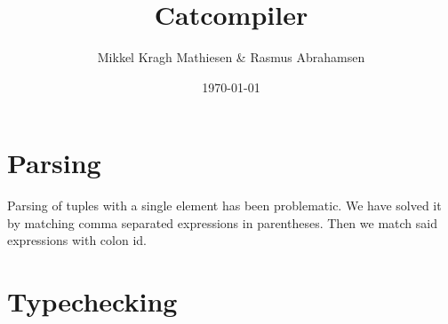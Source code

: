 \documentclass{article}
\author{Mikkel Kragh Mathiesen \& Rasmus Abrahamsen}
\title{Catcompiler}
\date{\today}
\begin{document}
\maketitle

\section{Parsing}

Parsing of tuples with a single element has been problematic. We have solved it by matching comma separated expressions in parentheses. Then we match said expressions with colon id.

\section{Typechecking}
\end{document}
